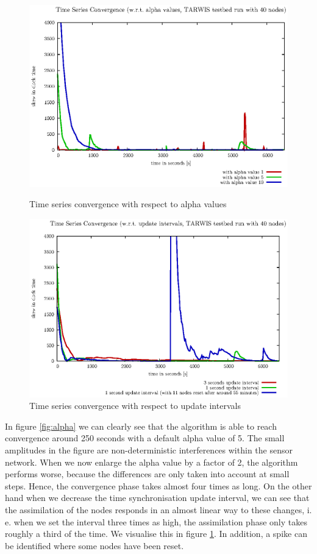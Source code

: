 \documentclass{llncs}
\begin{document}
\begin{figure}[h]
	\centering
	\includegraphics[scale=0.7]{images/FIG_01.eps}
	\caption{Time series convergence with respect to alpha values}
	\label{fig:alpha}
	\bigskip
	\bigskip
	\centering
	\includegraphics[scale=0.7]{images/FIG_02.eps}
	\caption{Time series convergence with respect to update intervals}
	\label{fig:update_intervals}
\end{figure}


\noindent In figure \ref{fig:alpha} we can clearly see that the algorithm is able to reach convergence around 250 seconds with a default alpha value of 5. The small amplitudes in the figure are non-deterministic interferences within the sensor network. When we now enlarge the alpha value by a factor of 2, the algorithm performs worse, because the differences are only taken into account at small steps. Hence, the convergence phase takes almost four times as long.
On the other hand when we decrease the time synchronisation update interval, we can see that the assimilation of the nodes responds in an almost linear way to these changes, i. e. when we set the interval three times as high, the assimilation phase only takes roughly a third of the time. We visualise this in figure \ref{fig:update_intervals}. In addition, a spike can be identified where some nodes have been reset.\\
\end{document}
